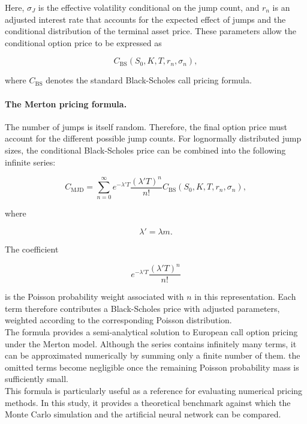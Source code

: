 \documentclass{article}
\begin{document}
	Here, $\sigma_J$ is the effective volatility conditional on the jump count, and $r_n$ is an adjusted interest rate that accounts for the expected effect of jumps and the conditional distribution of the terminal asset price. These parameters allow the conditional option price to be expressed as
	
	\[
	C_{\mathrm{BS}}
	(S_0,K,T,r_n,\sigma_n),
	\]
	
	where $C_{\mathrm{BS}}$ denotes the standard Black-Scholes call pricing formula.
	
	\paragraph{The Merton pricing formula.}
	
	The number of jumps is itself random. Therefore, the final option price must account for the different possible jump counts. For lognormally distributed jump sizes, the conditional Black-Scholes price can be combined into the following infinite series:
	
	\[
	C_{\mathrm{MJD}}
	=
	\sum_{n=0}^{\infty}
	e^{-\lambda'T}
	\frac{(\lambda'T)^n}{n!}
	C_{\mathrm{BS}}
	(S_0,K,T,r_n,\sigma_n),
	\]
	
	where
	
	\[
	\lambda'=\lambda m.
	\]
	
	The coefficient
	
	\[
	e^{-\lambda'T}
	\frac{(\lambda'T)^n}{n!}
	\]
	
	is the Poisson probability weight associated with $n$ in this representation. Each term therefore contributes a Black-Scholes price with adjusted parameters, weighted according to the corresponding Poisson distribution.\\
	The formula provides a semi-analytical solution to European call option pricing under the Merton model. Although the series contains infinitely many terms, it can be approximated numerically by summing only a finite number of them. the omitted terms become negligible once the remaining Poisson probability mass is sufficiently small. \\
	This formula is particularly useful as a reference for evaluating numerical pricing methods. In this study, it provides a theoretical benchmark against which the Monte Carlo simulation and the artificial neural network can be compared.
	
\end{document}

